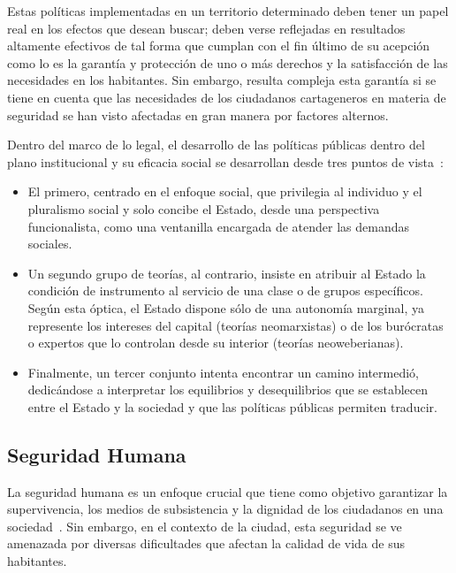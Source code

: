 \documentclass[letterpaper, 12pt]{article}
\begin{document}
Estas políticas implementadas en un territorio determinado
deben tener un papel real en los efectos que desean buscar;
deben verse reflejadas en resultados altamente efectivos de
tal forma que cumplan con el fin último de su acepción como
lo es la garantía y protección de uno o más derechos y la
satisfacción de las necesidades en los habitantes. Sin
embargo, resulta compleja esta garantía si se tiene en
cuenta que las necesidades de los ciudadanos cartageneros
en materia de seguridad se han visto afectadas en gran
manera por factores alternos.

Dentro del marco de lo legal, el desarrollo de las
políticas públicas dentro del plano institucional y su
eficacia social se desarrollan desde tres puntos de
vista~\cite{Thoenig}:

\begin{itemize}
    \item El primero, centrado en el enfoque social, que privilegia
          al individuo y el pluralismo social y solo concibe el
          Estado, desde una perspectiva funcionalista, como una
          ventanilla encargada de atender las demandas sociales.

    \item Un segundo grupo de teorías, al contrario, insiste en
          atribuir al Estado la condición de instrumento al servicio
          de una clase o de grupos específicos. Según esta óptica, el
          Estado dispone sólo de una autonomía marginal, ya
          represente los intereses del capital (teorías neomarxistas)
          o de los burócratas o expertos que lo controlan desde su
          interior (teorías neoweberianas).

    \item Finalmente, un tercer conjunto intenta encontrar un camino
          intermedió, dedicándose a interpretar los equilibrios y
          desequilibrios que se establecen entre el Estado y la
          sociedad y que las políticas públicas permiten traducir.
\end{itemize}


\subsection*{Seguridad Humana}

La seguridad humana es un enfoque crucial que tiene como
objetivo garantizar la supervivencia, los medios de
subsistencia y la dignidad de los ciudadanos en una
sociedad~\cite{DSUAdmin}. Sin embargo, en el contexto de la
ciudad, esta seguridad se ve amenazada por diversas
dificultades que afectan la calidad de vida de sus
habitantes.
\end{document}
